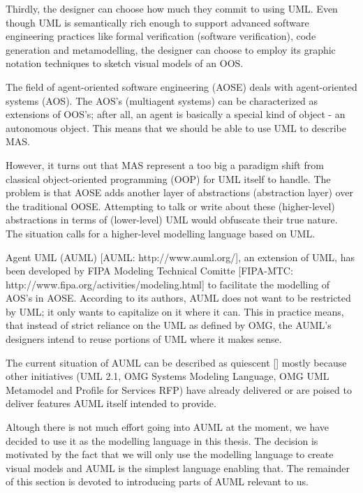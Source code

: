 Thirdly, the designer can choose how much they commit to using UML.
Even though UML is semantically rich enough to support advanced software engineering practices like formal verification (software verification), code generation and metamodelling, the designer can choose to employ its graphic notation techniques to sketch visual models of an OOS.


The field of agent-oriented software engineering (AOSE) deals with agent-oriented systems (AOS).
The AOS's (multiagent systems) can be characterized as extensions of OOS's; after all, an agent is basically a special kind of object - an autonomous object.
This means that we should be able to use UML to describe MAS.

However, it turns out that MAS represent a too big a paradigm shift from classical object-oriented programming (OOP) for UML itself to handle.
The problem is that AOSE adds another layer of abstractions (abstraction layer) over the traditional OOSE.
Attempting to talk or write about these (higher-level) abstractions in terms of (lower-level) UML would obfuscate their true nature.
The situation calls for a higher-level modelling language based on UML.

Agent UML (AUML) [AUML: http://www.auml.org/], an extension of UML, has been developed by FIPA Modeling Technical Comitte [FIPA-MTC: http://www.fipa.org/activities/modeling.html] to facilitate the modelling of AOS's in AOSE.
According to its authors, AUML does not want to be restricted by UML; it only wants to capitalize on it where it can.
This in practice means, that instead of strict reliance on the UML as defined by OMG, the AUML's designers intend to reuse portions of UML where it makes sense.

The current situation of AUML can be described as quiescent [] mostly because other initiatives (UML 2.1, OMG Systems Modeling Language,  OMG UML Metamodel and Profile for Services RFP) have already delivered or are poised to deliver features AUML itself intended to provide.

Altough there is not much effort going into AUML at the moment, we have decided to use it as the modelling language in this thesis.
The decision is motivated by the fact that we will only use the modelling language to create visual models and AUML is the simplest language enabling that.
The remainder of this section is devoted to introducing parts of AUML relevant to us.







